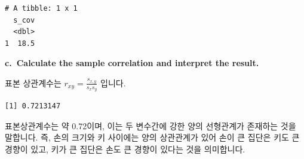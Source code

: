 \documentclass[
  a4paper,
  DIV=11,
  numbers=noendperiod]{scrreprt}
\newenvironment{Shaded}{\begin{snugshade}}{\end{snugshade}}
\newcommand{\FunctionTok}[1]{\textcolor[rgb]{0.28,0.35,0.67}{#1}}
\newcommand{\NormalTok}[1]{\textcolor[rgb]{0.00,0.23,0.31}{#1}}
\newcommand{\OtherTok}[1]{\textcolor[rgb]{0.00,0.23,0.31}{#1}}
\newcommand{\SpecialCharTok}[1]{\textcolor[rgb]{0.37,0.37,0.37}{#1}}
\begin{document}
\begin{verbatim}
# A tibble: 1 x 1
  s_cov
  <dbl>
1  18.5
\end{verbatim}

\textbf{c.~Calculate the sample correlation and interpret the result.}

표본 상관계수는 \(r_{xy}=\frac{s_{x,y}}{s_xs_y}\) 입니다.

\begin{Shaded}
\end{Shaded}

\begin{verbatim}
[1] 0.7213147
\end{verbatim}

표본상관계수는 약 0.72이며, 이는 두 변수간에 강한 양의 선형관계가
존재하는 것을 말합니다. 즉, 손의 크기와 키 사이에는 양의 상관관계가 있어
손이 큰 집단은 키도 큰 경향이 있고, 키가 큰 집단은 손도 큰 경향이 있다는
것을 의미합니다.
\end{document}
